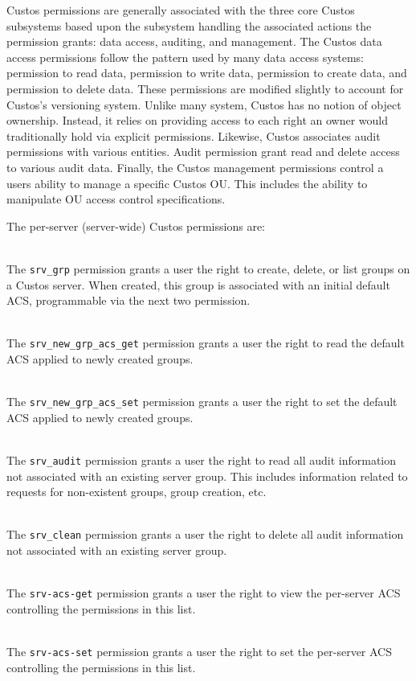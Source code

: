 Custos permissions are generally associated with the three core Custos
subsystems based upon the subsystem handling the associated actions
the permission grants: data access, auditing, and management. The
Custos data access permissions follow the pattern used by many data
access systems: permission to read data, permission to write data,
permission to create data, and permission to delete data. These
permissions are modified slightly to account for Custos's versioning
system. Unlike many system, Custos has no notion of object
ownership. Instead, it relies on providing access to each right an
owner would traditionally hold via explicit permissions. Likewise,
Custos associates audit permissions with various entities. Audit
permission grant read and delete access to various audit data.
Finally, the Custos management permissions control a users ability to
manage a specific Custos OU. This includes the ability to manipulate
OU access control specifications.

\noindent
The per-server (server-wide) Custos permissions are:

\begin{packed_desc}
\item[\texttt{srv\_grp}] \hfill \\ The \texttt{srv\_grp} permission
  grants a user the right to create, delete, or list groups on a
  Custos server. When created, this group is associated with an
  initial default ACS, programmable via the next two permission.
\item[\texttt{srv\_new\_grp\_acs\_get}] \hfill \\ The
  \texttt{srv\_new\_grp\_acs\_get} permission grants a user the right
    to read the default ACS applied to newly created groups.
\item[\texttt{srv\_new\_grp\_acs\_set}] \hfill \\ The
  \texttt{srv\_new\_grp\_acs\_set} permission grants a user the right
  to set the default ACS applied to newly created groups.
\item[\texttt{srv\_audit}] \hfill \\ The \texttt{srv\_audit}
  permission grants a user the right to read all audit information not
  associated with an existing server group. This includes information
  related to requests for non-existent groups, group creation, etc.
\item[\texttt{srv\_clean}] \hfill \\ The \texttt{srv\_clean}
  permission grants a user the right to delete all audit information
  not associated with an existing server group.
\item[\texttt{srv-acs-get}] \hfill \\ The \texttt{srv-acs-get}
  permission grants a user the right to view the per-server ACS
  controlling the permissions in this list.
\item[\texttt{srv-acs-set}] \hfill \\ The \texttt{srv-acs-set}
  permission grants a user the right to set the per-server ACS
  controlling the permissions in this list.
\end{packed_desc}

